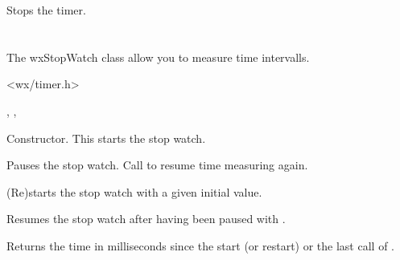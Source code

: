 

Stops the timer.

\section{}\label{wxstopwatch}

The wxStopWatch class allow you to measure time intervalls. 


<wx/timer.h>


, , 




Constructor. This starts the stop watch.

\label{wxstopwatchpause}


Pauses the stop watch. Call  to resume 
time measuring again.



(Re)starts the stop watch with a given initial value.

\label{wxstopwatchresume}


Resumes the stop watch after having been paused with .


\label{wxstopwatchtime}

Returns the time in milliseconds since the start (or restart) or the last call of 
.
